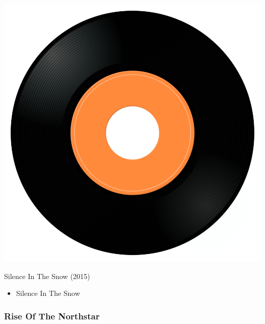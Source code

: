 \begin{minipage}[t]{0.25\textwidth}
\captionsetup{type=figure}
\includegraphics[width=\textwidth]{Images/cover.png}
\caption*{Silence In The Snow (2015)}
\end{minipage}
\begin{minipage}[t]{0.25\textwidth}\vspace{0pt}
\begin{itemize}[nosep,leftmargin=1em,labelwidth=*,align=left]
	\setlength{\itemsep}{0pt}
	\item Silence In The Snow
\end{itemize}
\end{minipage}

\subsubsection{Rise Of The Northstar}

